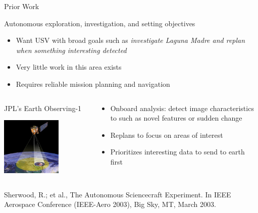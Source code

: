 \documentclass[9pt]{beamer}
\begin{document}
\begin{frame}{Prior Work} \label{PW:sciencecraft}
    \begin{block}{Autonomous exploration, investigation, and setting objectives}
	    \begin{itemize}
    	    \item Want USV with broad goals such as \textit{investigate Laguna Madre and replan when something interesting detected}
            \item Very little work in this area exists
	        \item Requires reliable mission planning and navigation
        \end{itemize}
        \begin{columns}
            \begin{column}{0.50\textwidth}
                \begin{block}{JPL's Earth Observing-1}
                    \begin{center}
                        \includegraphics[width=0.65\textwidth,trim={0cm 0cm 0cm 0cm},clip]{img/eo1.jpg}
                    \end{center}
                \end{block}
            \end{column}
            \begin{column}{0.50\textwidth}
                \begin{block}{}
                    \begin{itemize}
        	            \item Onboard analysis: detect image characteristics to such as novel features or sudden change
                        \item Replans to focus on areas of interest
    	                \item Prioritizes interesting data to send to earth first
                    \end{itemize}
                \end{block}
            \end{column}
        \end{columns}
        \small{Sherwood, R.; et al., The Autonomous Sciencecraft Experiment. In IEEE Aerospace Conference (IEEE-Aero 2003), Big Sky, MT, March 2003.}
    \end{block}
\end{frame}  
\end{document}
